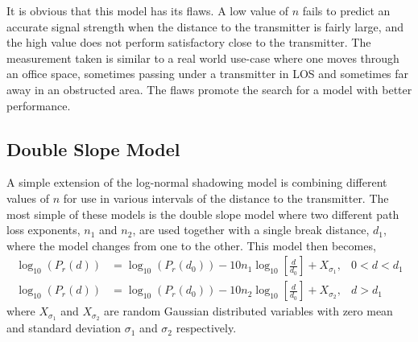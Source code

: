 \documentclass{LTHthesis}
\begin{document}
It is obvious that this model has its flaws. A low value of $n$ fails to predict an accurate signal strength when the distance to the transmitter is fairly large, and the high value does not perform satisfactory close to the transmitter. The measurement taken is similar to a real world use-case where one moves through an office space, sometimes passing under a transmitter in LOS and sometimes far away in an obstructed area. The flaws promote the search for a model with better performance.
%
\subsection{Double Slope Model}
%
A simple extension of the log-normal shadowing model is combining different values of $n$ for use in various intervals of the distance to the transmitter. The most simple of these models is the double slope model where two different path loss exponents, $n_1$ and $n_2$, are used together with a single break distance, $d_1$, where the model changes from one to the other. This model then becomes,
\begin{subequations}
\begin{align}
\log_{10}({P_r(d)})&=\log_{10}({P_r(d_0)})-10n_1\log_{10}\left[{\frac{d}{d_0}}\right] + X_{\sigma_1}, & 0<d<d_1\\
\log_{10}({P_r(d)})&=\log_{10}({P_r(d_0)})-10n_2\log_{10}\left[{\frac{d}{d_0}}\right] + X_{\sigma_2}, & d>d_1
\end{align}
\end{subequations} 
where $X_{\sigma_1}$ and $X_{\sigma_2}$ are random Gaussian distributed variables with zero mean and standard deviation $\sigma_1$ and $\sigma_2$ respectively.
 
\end{document}
